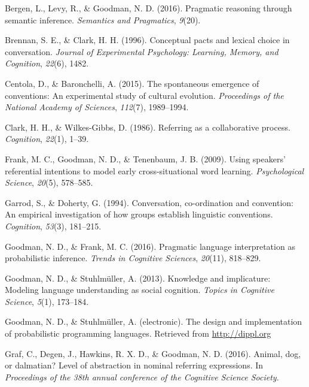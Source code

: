 \documentclass[10pt, letterpaper]{article}
\begin{document}
\hypertarget{ref-BergenLevyGoodman16_LexicalUncertainty}{}
Bergen, L., Levy, R., \& Goodman, N. D. (2016). Pragmatic reasoning
through semantic inference. \emph{Semantics and Pragmatics},
\emph{9}(20).

\hypertarget{ref-BrennanClark96_ConceptualPactsConversation}{}
Brennan, S. E., \& Clark, H. H. (1996). Conceptual pacts and lexical
choice in conversation. \emph{Journal of Experimental Psychology:
Learning, Memory, and Cognition}, \emph{22}(6), 1482.

\hypertarget{ref-CentolaBaronchelli15_ConventionEmergence}{}
Centola, D., \& Baronchelli, A. (2015). The spontaneous emergence of
conventions: An experimental study of cultural evolution.
\emph{Proceedings of the National Academy of Sciences}, \emph{112}(7),
1989--1994.

\hypertarget{ref-ClarkWilkesGibbs86_ReferringCollaborative}{}
Clark, H. H., \& Wilkes-Gibbs, D. (1986). Referring as a collaborative
process. \emph{Cognition}, \emph{22}(1), 1--39.

\hypertarget{ref-FrankGoodmanTenenbaum09_Wurwur}{}
Frank, M. C., Goodman, N. D., \& Tenenbaum, J. B. (2009). Using
speakers' referential intentions to model early cross-situational word
learning. \emph{Psychological Science}, \emph{20}(5), 578--585.

\hypertarget{ref-GarrodDoherty94_GroupConventionsLinguistics}{}
Garrod, S., \& Doherty, G. (1994). Conversation, co-ordination and
convention: An empirical investigation of how groups establish
linguistic conventions. \emph{Cognition}, \emph{53}(3), 181--215.

\hypertarget{ref-GoodmanFrank16_RSATiCS}{}
Goodman, N. D., \& Frank, M. C. (2016). Pragmatic language
interpretation as probabilistic inference. \emph{Trends in Cognitive
Sciences}, \emph{20}(11), 818--829.

\hypertarget{ref-GoodmanStuhlmuller13_KnowledgeImplicature}{}
Goodman, N. D., \& Stuhlmüller, A. (2013). Knowledge and implicature:
Modeling language understanding as social cognition. \emph{Topics in
Cognitive Science}, \emph{5}(1), 173--184.

\hypertarget{ref-GoodmanStuhlmuller14_DIPPL}{}
Goodman, N. D., \& Stuhlmüller, A. (electronic). The design and
implementation of probabilistic programming languages. Retrieved from
\url{http://dippl.org}

\hypertarget{ref-GrafEtAl16_BasicLevel}{}
Graf, C., Degen, J., Hawkins, R. X. D., \& Goodman, N. D. (2016).
Animal, dog, or dalmatian? Level of abstraction in nominal referring
expressions. In \emph{Proceedings of the 38th annual conference of the
Cognitive Science Society}.
\end{document}
